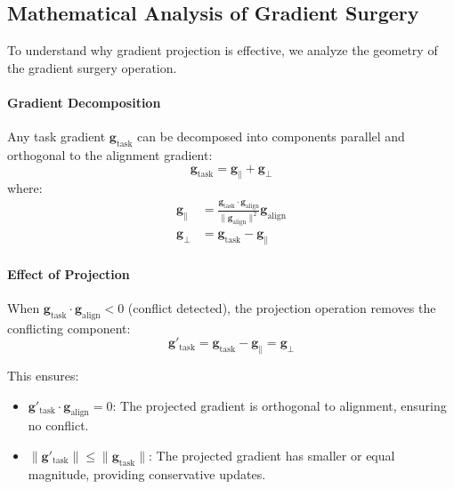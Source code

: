 \subsection{Mathematical Analysis of Gradient Surgery}
\label{subsec:gradient_analysis}

To understand why gradient projection is effective, we analyze the geometry of the gradient surgery operation.

\paragraph{Gradient Decomposition}
Any task gradient $\mathbf{g}_{\text{task}}$ can be decomposed into components parallel and orthogonal to the alignment gradient:
\begin{equation}
\mathbf{g}_{\text{task}} = \mathbf{g}_{\parallel} + \mathbf{g}_{\perp}
\end{equation}
where:
\begin{align}
\mathbf{g}_{\parallel} &= \frac{\mathbf{g}_{\text{task}} \cdot \mathbf{g}_{\text{align}}}{\|\mathbf{g}_{\text{align}}\|^2} \mathbf{g}_{\text{align}} \\
\mathbf{g}_{\perp} &= \mathbf{g}_{\text{task}} - \mathbf{g}_{\parallel}
\end{align}

\paragraph{Effect of Projection}
When $\mathbf{g}_{\text{task}} \cdot \mathbf{g}_{\text{align}} < 0$ (conflict detected), the projection operation removes the conflicting component:
\begin{equation}
\mathbf{g}'_{\text{task}} = \mathbf{g}_{\text{task}} - \mathbf{g}_{\parallel} = \mathbf{g}_{\perp}
\end{equation}

This ensures:
\begin{itemize}
    \item $\mathbf{g}'_{\text{task}} \cdot \mathbf{g}_{\text{align}} = 0$: The projected gradient is orthogonal to alignment, ensuring no conflict.
    \item $\|\mathbf{g}'_{\text{task}}\| \leq \|\mathbf{g}_{\text{task}}\|$: The projected gradient has smaller or equal magnitude, providing conservative updates.
\end{itemize}

